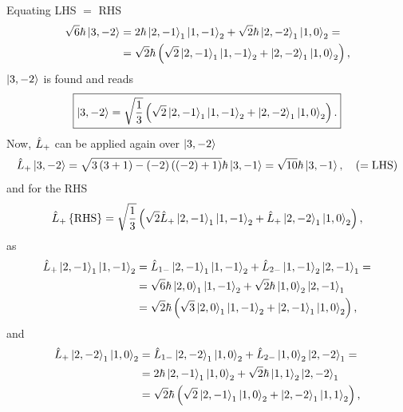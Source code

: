 Equating LHS $=$ RHS 
\begin{equation}
    \begin{split}
        \sqrt{6} \hbar \Ket{3,-2} &=
        2 \hbar \Ket{2,-1}_1 \Ket{1,-1}_2 + \sqrt{2} \hbar \Ket{2,-2}_1 \Ket{1,0}_2 = \\
                                  &= \sqrt{2} \hbar \left( \sqrt{2} \Ket{2,-1}_1 \Ket{1,-1}_2 + \Ket{2,-2}_1 \Ket{1,0}_2 \right) ,
    \end{split}
\end{equation}
$\Ket{3,-2}$ is found and reads 
\begin{equation}
    \boxed{
        \Ket{3,-2} =
        \sqrt{\frac{1}{3}} \left( \sqrt{2} \Ket{2,-1}_1 \Ket{1,-1}_2 + \Ket{2,-2}_1 \Ket{1,0}_2 \right).
    }
\end{equation}
Now, $\hat{L}_{+}$ can be applied again over $\Ket{3,-2}$
\begin{equation}
    \hat{L}_{+} \Ket{3,-2} =
    \sqrt{3\left( 3 + 1 \right) - \left( -2 \right)\left( \left( -2 \right) + 1 \right)} \hbar \Ket{3,-1} =
    \sqrt{10} \hbar \Ket{3,-1}, \quad \left( =\text{LHS} \right)
\end{equation}
and for the RHS
\begin{equation}
    \hat{L}_{+} 
    \left\{ \text{RHS} \right\}
    = 
    \sqrt{\frac{1}{3}} \left( \sqrt{2} \hat{L}_{+} \Ket{2,-1}_1 \Ket{1,-1}_2 + \hat{L}_{+} \Ket{2,-2}_1 \Ket{1,0}_2 \right),
\end{equation}
as
\begin{align}
    \notag \hat{L}_{+} \Ket{2,-1}_1 \Ket{1,-1}_2 &= \hat{L}_{1-} \Ket{2,-1}_1 \Ket{1,-1}_2 + \hat{L}_{2-} \Ket{1,-1}_2 \Ket{2,-1}_1 = \\
    \notag                         &= \sqrt{6} \hbar \Ket{2,0}_1 \Ket{1,-1}_2 + \sqrt{2} \hbar \Ket{1,0}_2 \Ket{2,-1}_1 \\
                                   &= \sqrt{2} \hbar \left( \sqrt{3} \Ket{2,0}_1 \Ket{1,-1}_2 + \Ket{2,-1}_1 \Ket{1,0}_2 \right),
\end{align}
and
\begin{align}
    \notag \hat{L}_{+} \Ket{2,-2}_1 \Ket{1,0}_2  &= \hat{L}_{1-} \Ket{2,-2}_1 \Ket{1,0}_2 + \hat{L}_{2-} \Ket{1,0}_2 \Ket{2,-2}_1 = \\
    \notag                         &= 2 \hbar \Ket{2,-1}_1 \Ket{1,0}_2 + \sqrt{2} \hbar \Ket{1,1}_2 \Ket{2,-2}_1 \\
                                   &= \sqrt{2} \hbar \left( \sqrt{2} \Ket{2,-1}_1 \Ket{1,0}_2 + \Ket{2,-2}_1 \Ket{1,1}_2 \right),
\end{align}
